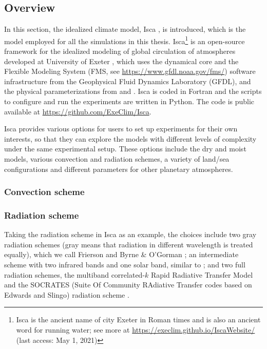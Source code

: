 \subsection{Overview}

In this section, the idealized climate model, Isca \citep{Vallis2018}, is introduced, which is the model employed for all the simulations in this thesis. Isca\footnote{Isca is the ancient name of city Exeter in Roman times and is also an ancient word for running water; see more at \url{https://execlim.github.io/IscaWebsite/} (last access: May 1, 2021)} is an open-source framework for the idealized modeling of global circulation of atmospheres developed at University of Exeter \citep{Vallis2018}, which uses the dynamical core and the Flexible Modeling System (FMS, see \url{https://www.gfdl.noaa.gov/fms/}) software infrastructure from the Geophysical Fluid Dynamics Laboratory (GFDL), and the physical parameterizations from \citet{Frierson2006} and \citet{Frierson2007}. Isca is coded in Fortran and the scripts to configure and run the experiments are written in Python. The code is public available at \url{https://github.com/ExeClim/Isca}.

Isca provides various options for users to set up experiments for their own interests, so that they can explore the models with different levels of complexity under the same experimental setup. These options include the dry and moist models, various convection and radiation schemes, a variety of land/sea configurations and different parameters for other planetary atmospheres.

\subsubsection{Convection scheme}

\subsubsection{Radiation scheme}
Taking the radiation scheme in Isca as an example, the choices include two gray radiation schemes (gray means that radiation in different wavelength is treated equally), which we call Frierson \citep{Frierson2006} and Byrne \& O'Gorman \citep[BOG;][]{Byrne2013}; an intermediate scheme with two infrared bands and one solar band, similar to \cite{Geen2016}; and two full radiation schemes, the multiband correlated-$k$ Rapid Radiative Transfer Model \citep[RRTM;][]{Clough2005} and the SOCRATES (Suite Of Community RAdiative Transfer codes based on Edwards and Slingo) radiation scheme  \citep{Edwards1996, Manners2015}. 

